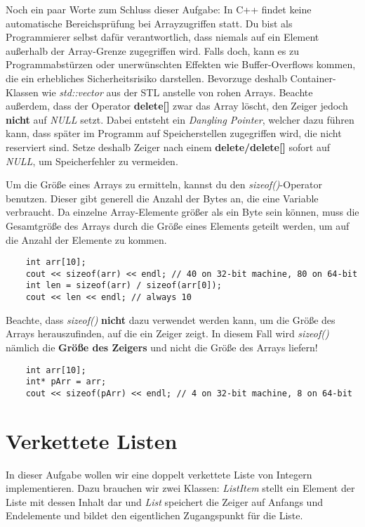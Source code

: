 \documentclass[
  accentcolor=tud1c,	%
  colorbacktitle,		%
  inverttitle,			%
  german,				%
  twoside
]{tudexercise}
\begin{document}
Noch ein paar Worte zum Schluss dieser Aufgabe:
In C++ findet keine automatische Bereichsprüfung bei Arrayzugriffen statt. Du bist als Programmierer selbst dafür verantwortlich, dass niemals auf ein Element außerhalb der Array-Grenze zugegriffen wird.
Falls doch, kann es zu Programmabstürzen oder unerwünschten Effekten wie  Buffer-Overflows kommen, die ein erhebliches Sicherheitsrisiko darstellen.
Bevorzuge deshalb Container-Klassen wie \emph{std::vector} aus der STL anstelle von \glqq rohen\grqq{} Arrays.
Beachte außerdem, dass der Operator \textbf{delete[]} zwar das Array löscht, den Zeiger jedoch \textbf{nicht} auf \emph{NULL} setzt.
Dabei entsteht ein \emph{Dangling Pointer}, welcher dazu führen kann, dass später im Programm auf Speicherstellen zugegriffen wird, die nicht reserviert sind.
Setze deshalb Zeiger nach einem \textbf{delete/delete[]} sofort auf \emph{NULL}, um Speicherfehler zu vermeiden.

Um die Größe eines Arrays zu ermitteln, kannst du den \emph{sizeof()}-Operator benutzen. Dieser gibt generell die Anzahl der Bytes an, die eine Variable verbraucht. Da einzelne Array-Elemente größer als ein Byte sein können, muss die Gesamtgröße des Arrays durch die Größe eines Elements geteilt werden, um auf die Anzahl der Elemente zu kommen.
\begin{lstlisting}
	int arr[10];
	cout << sizeof(arr) << endl; // 40 on 32-bit machine, 80 on 64-bit
	int len = sizeof(arr) / sizeof(arr[0]); 
	cout << len << endl; // always 10
\end{lstlisting}

Beachte, dass \emph{sizeof()} \textbf{nicht} dazu verwendet werden kann, um die Größe des Arrays herauszufinden, auf die ein Zeiger zeigt. In diesem Fall wird \emph{sizeof()} nämlich die \textbf{Größe des Zeigers} und nicht die Größe des Arrays liefern!
\begin{lstlisting}
	int arr[10];
	int* pArr = arr;
	cout << sizeof(pArr) << endl; // 4 on 32-bit machine, 8 on 64-bit
\end{lstlisting}


\section{Verkettete Listen}
In dieser Aufgabe wollen wir eine doppelt verkettete Liste von Integern implementieren.
Dazu brauchen wir zwei Klassen: 
\emph{ListItem} stellt ein Element der Liste mit dessen Inhalt dar und \emph{List} speichert die Zeiger auf Anfangs und Endelemente und bildet den eigentlichen Zugangspunkt für die Liste.
\end{document}
